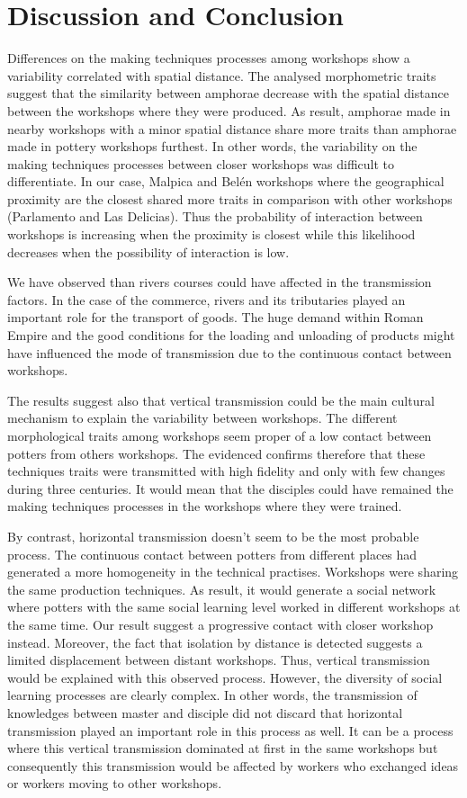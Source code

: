 \documentclass[review]{elsarticle}
\begin{document}
\section{Discussion and Conclusion}


Differences on the making techniques processes among workshops show a variability correlated with spatial distance. The analysed morphometric traits suggest that the similarity between amphorae decrease with the spatial distance between the workshops where they were produced. As result, amphorae made in nearby workshops with a minor spatial distance share more traits than amphorae made in pottery workshops furthest. In other words, the variability on the making techniques processes between closer workshops was difficult to differentiate. In our case, Malpica and Bel\'en workshops where the geographical proximity are the closest shared more traits in comparison with other workshops (Parlamento and Las Delicias). Thus the probability of interaction between workshops is increasing when the proximity is closest while this likelihood decreases when the possibility of interaction is low. 

We have observed than rivers courses could have affected in the transmission factors. In the case of the commerce, rivers and its tributaries played an important role for the transport of goods. The huge demand within Roman Empire and the good conditions for the loading and unloading of products \citep{bevan_mediterranean_2014} might have influenced the mode of transmission due to the continuous contact between workshops. 

The results suggest also that vertical transmission could be the main cultural mechanism to explain the variability between workshops. The different morphological traits among workshops seem proper of a low contact between potters from others workshops. The evidenced confirms therefore that these techniques traits were transmitted with high fidelity and only with few changes during three centuries. It would mean that the disciples could have remained the making techniques processes in the workshops where they were trained.  

By contrast, horizontal transmission doesn't seem to be the most probable process. The continuous contact between potters from different places had generated a more homogeneity in the technical practises. Workshops were sharing the same production techniques. As result, it would generate a social network where potters with the same social learning level worked in different workshops at the same time. Our result suggest a progressive contact with closer workshop instead. Moreover, the fact that isolation by distance is detected suggests a limited displacement between distant workshops. Thus, vertical transmission would be explained with this observed process. However, the diversity of social learning processes are clearly complex. In other words, the transmission of knowledges between master and disciple did not discard that horizontal transmission played an important role in this process as well. It can be a process where this vertical transmission dominated at first in the same workshops but consequently this transmission would be affected by workers who exchanged ideas or workers moving to other workshops.  
\end{document}

